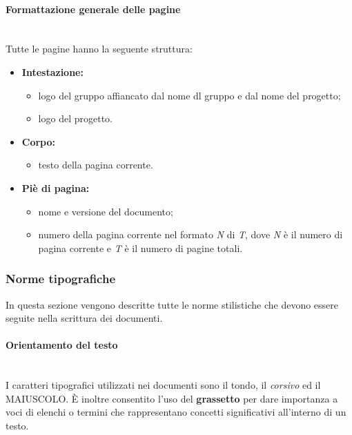 \paragraph{Formattazione generale delle pagine}\mbox{}\\
Tutte le pagine hanno la seguente struttura:
\begin{itemize}
	\item \textbf{Intestazione:}
	\begin{itemize}
		\item logo del gruppo affiancato dal nome dl gruppo e dal nome del progetto;
		\item logo del progetto.
	\end{itemize}
		\item \textbf{Corpo:}
		\begin{itemize}
			\item testo della pagina corrente.
		\end{itemize}
	\item \textbf{Piè di pagina:}
	\begin{itemize}
		\item nome e versione del documento;
		\item numero della pagina corrente nel formato \textit{N} di \textit{T}, dove \textit{N} è il numero di pagina corrente e \textit{T} è il numero di pagine totali.
	\end{itemize}
\end{itemize}

\subsubsection{Norme tipografiche}
In questa sezione vengono descritte tutte le norme stilistiche che devono essere seguite nella scrittura dei documenti. 

\paragraph{Orientamento del testo}\mbox{}\\
I caratteri tipografici utilizzati nei documenti sono il tondo, il \textit{corsivo} ed il MAIUSCOLO. È inoltre consentito l'uso del \textbf{grassetto} per dare importanza a voci di elenchi o termini che rappresentano concetti significativi all'interno di un testo.

